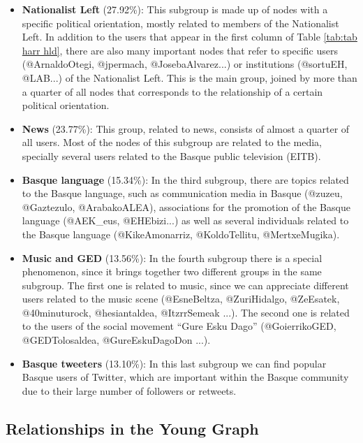 \documentclass[information,article,submit,moreauthors,pdftex,10pt,a4paper]{Definitions/mdpi}
\begin{document}
\begin{itemize}

\item \textbf{Nationalist Left} (27.92\%): This subgroup is made up of nodes with a specific political orientation, mostly related to members of the Nationalist Left. In addition to the users that appear in the first column of Table \ref{tab:tab harr hld}, there are also many important nodes that refer to specific users (@ArnaldoOtegi, @jpermach, @JosebaAlvarez...) or institutions (@sortuEH, @LAB...) of the Nationalist Left. This is the main group, joined by more than a quarter of all nodes that corresponds to the relationship of a certain political orientation.

\item \textbf{News} (23.77\%): This group, related to news, consists of almost a quarter of all users. Most of the nodes of this subgroup are related to the media, specially several users related to the Basque public television (EITB).

\item \textbf{Basque language} (15.34\%): In the third subgroup, there are topics related to the Basque language, such as communication media in Basque (@zuzeu, @Gaztezulo, @ArabakoALEA), associations for the promotion of the Basque language (@AEK\_eus, @EHEbizi...) as well as several individuals related to the Basque language (@KikeAmonarriz, @KoldoTellitu, @MertxeMugika).

\item \textbf{Music and GED} (13.56\%): In the fourth subgroup there is a special phenomenon, since it brings together two different groups in the same subgroup. The first one is related to music, since we can appreciate different users related to the music scene (@EsneBeltza, @ZuriHidalgo, @ZeEsatek, @40minuturock, @hesiantaldea, @ItzrrSemeak ...). The second one is related to the users of the social movement ``Gure Esku Dago'' (@GoierrikoGED, @GEDTolosaldea, @GureEskuDagoDon ...).

\item \textbf{Basque tweeters} (13.10\%): In this last subgroup we can find popular Basque users of Twitter, which are important within the Basque community due to their large number of followers or retweets.
\end{itemize}

\subsection{Relationships in the Young Graph}\label{sec:relat-young-subgr}
\end{document}
